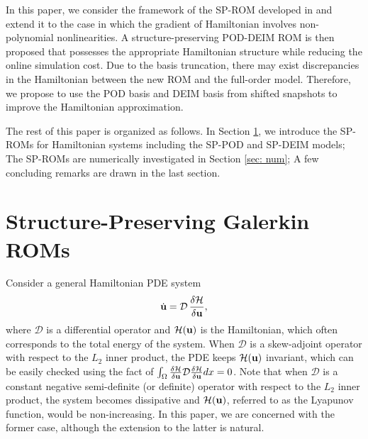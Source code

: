 \documentclass[11pt]{article}
\begin{document}
In this paper, we consider the framework of the SP-ROM developed in \cite{gong2017structure} and extend it to the case in which the gradient of Hamiltonian involves non-polynomial nonlinearities. A structure-preserving POD-DEIM ROM is then proposed that possesses the appropriate Hamiltonian structure while reducing the online simulation cost. Due to the basis truncation, there may exist discrepancies in the Hamiltonian between the new ROM and the full-order model.
Therefore, we propose to use the POD basis and DEIM basis from shifted snapshots to improve the Hamiltonian approximation.

The rest of this paper is organized as follows.
In Section \ref{sec: alg}, we introduce the SP-ROMs for Hamiltonian systems including the SP-POD and SP-DEIM models;
The SP-ROMs are numerically investigated in Section \ref{sec: num};
A few concluding remarks are drawn in the last section.

\section{Structure-Preserving Galerkin ROMs}\label{sec: alg}

\noindent \indent Consider a general Hamiltonian PDE system
\begin{equation}
\dot{{\bf u}} = \mathcal{D}\, \frac{\delta \mathcal{H}}{\delta {\bf u}},
\label{eq: ham_pde}
\end{equation}
where $\mathcal{D}$ is a differential operator and $\mathcal{H}({\bf u})$ is the Hamiltonian, which often corresponds to the total energy of the system.
When $\mathcal{D}$ is a skew-adjoint operator with respect to the $L_2$ inner product, the PDE keeps $\mathcal{H}({\bf u})$ invariant, which can be easily checked using the fact of  
$\int_{\Omega} \frac{\delta \mathcal{H}}{\delta {\bf u}} \mathcal{D} \frac{\delta \mathcal{H}}{\delta {\bf u}} dx = 0$. 
Note that when $\mathcal{D}$ is a constant negative semi-definite (or definite) operator with respect to the $L_2$ inner product, the system becomes dissipative and $\mathcal{H}({\bf u})$, referred to as the Lyapunov function, would be non-increasing. In this paper, we are concerned with the former case, although the extension to the latter is natural. 
\end{document}
